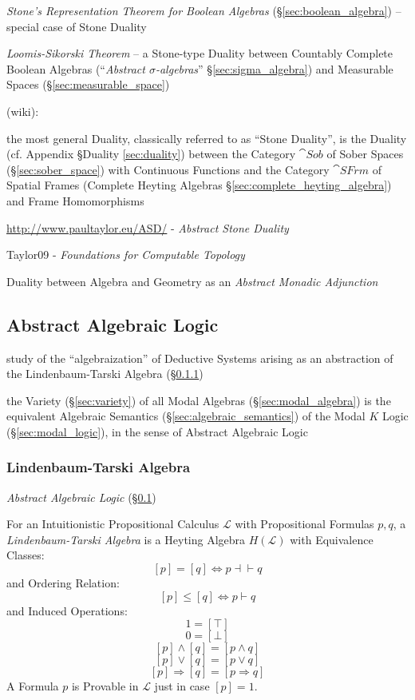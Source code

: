 \fist \emph{Stone's Representation Theorem for Boolean Algebras}
(\S\ref{sec:boolean_algebra}) -- special case of Stone Duality

\emph{Loomis-Sikorski Theorem} -- a Stone-type Duality between Countably
Complete Boolean Algebras (``\emph{Abstract $\sigma$-algebras}''
\S\ref{sec:sigma_algebra}) and Measurable Spaces (\S\ref{sec:measurable_space})

(wiki):

the most general Duality, classically referred to as ``Stone Duality'', is the
Duality (cf. Appendix \S Duality \ref{sec:duality}) between the Category
$\cat{Sob}$ of Sober Spaces (\S\ref{sec:sober_space}) with Continuous Functions
and the Category $\cat{SFrm}$ of Spatial Frames (Complete Heyting Algebras
\S\ref{sec:complete_heyting_algebra}) and Frame Homomorphisms

\url{http://www.paultaylor.eu/ASD/} - \emph{Abstract Stone Duality}

Taylor09 - \emph{Foundations for Computable Topology}

Duality between Algebra and Geometry as an \emph{Abstract Monadic Adjunction}



\subsection{Abstract Algebraic Logic}\label{sec:abstract_algebraic_logic}

study of the ``algebraization'' of Deductive Systems arising as an abstraction
of the Lindenbaum-Tarski Algebra (\S\ref{sec:lindenbaum_tarski})

the Variety (\S\ref{sec:variety}) of all Modal Algebras
(\S\ref{sec:modal_algebra}) is the equivalent Algebraic Semantics
(\S\ref{sec:algebraic_semantics}) of the Modal $K$ Logic
(\S\ref{sec:modal_logic}), in the sense of Abstract Algebraic Logic



\subsubsection{Lindenbaum-Tarski Algebra}\label{sec:lindenbaum_tarski}

\emph{Abstract Algebraic Logic} (\S\ref{sec:abstract_algebraic_logic})

\cite{awodey06}
For an Intuitionistic Propositional Calculus $\mathcal{L}$ with
Propositional Formulas $p,q$, a \emph{Lindenbaum-Tarski Algebra} is a
Heyting Algebra $H(\mathcal{L})$ with Equivalence Classes:
\[
  [p] = [q] \Leftrightarrow p \dashv \vdash q
\]
and Ordering Relation:
\[
  [p] \leq [q] \Leftrightarrow p \vdash q
\]
and Induced Operations:
\[
  1 = [\top]
\]\[
  0 = [\bot]
\]\[
  [p] \wedge [q] = [p \wedge q]
\]\[
  [p] \vee [q] = [p \vee q]
\]\[
  [p] \Rightarrow [q] = [p \Rightarrow q]
\]
A Formula $p$ is Provable in $\mathcal{L}$ just in case $[p] = 1$.


